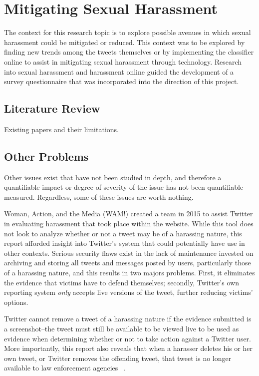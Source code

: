 \section{Mitigating Sexual Harassment}

The context for this research topic is to explore possible avenues in which sexual harassment could be mitigated or reduced. This context was to be explored by finding new trends among the tweets themselves or by implementing the classifier online to assist in mitigating sexual harassment through technology. Research into sexual harassment and harassment online guided the development of a survey questionnaire that was incorporated into the direction of this project.

\subsection{Literature Review}

Existing papers and their limitations.

\subsection{Other Problems}

Other issues exist that have not been studied in depth, and therefore a quantifiable impact or degree of severity of the issue has not been quantifiable measured. Regardless, some of these issues are worth nothing.

Woman, Action, and the Media (WAM!) created a team in 2015 to assist Twitter in evaluating harassment that took place within the website. While this tool does not look to analyze whether or not a tweet may be of a harassing nature, this report afforded insight into Twitter's system that could potentially have use in other contexts. Serious security flaws exist in the lack of maintenance invested on archiving and storing all tweets and messages posted by users, particularly those of a harassing nature, and this results in two majors problems. First, it eliminates the evidence that victims have to defend themselves; secondly, Twitter's own reporting system \textit{only} accepts live versions of the tweet, further reducing victims' options.

Twitter cannot remove a tweet of a harassing nature if the evidence submitted is a screenshot--the tweet must still be available to be viewed live to be used as evidence when determining whether or not to take action against a Twitter user. More importantly, this report also reveals that when a harasser deletes his or her own tweet, or Twitter removes the offending tweet, that tweet is no longer available to law enforcement agencies ~\cite{matias2015reporting}.

